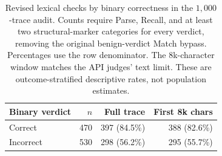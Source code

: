 \begin{table}[!ht]
\centering\small
\setlength{\tabcolsep}{4pt}
\begin{tabular}{lrrr}
\toprule
\textbf{Binary verdict} & $n$ & \textbf{Full trace} & \textbf{First 8k chars} \\
\midrule
Correct & 470 & 397 (84.5\%) & 388 (82.6\%) \\
Incorrect & 530 & 298 (56.2\%) & 295 (55.7\%) \\
\bottomrule\end{tabular}
\caption{Revised lexical checks by binary correctness in the $1{,}000$-trace audit.
Counts require Parse, Recall, and at least two structural-marker categories for every
verdict, removing the original benign-verdict Match bypass. Percentages use the row
denominator. The 8k-character window matches the API judges' text limit. These are
outcome-stratified descriptive rates, not population estimates.}
\label{tab:audit_sensitivity}
\end{table}
